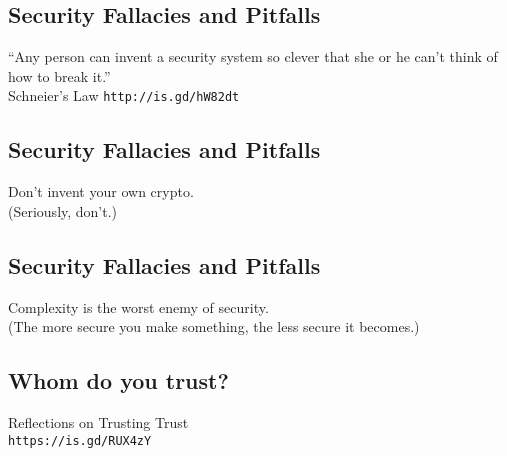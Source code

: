\documentclass[xga]{xdvislides}
\begin{document}
\subsection{Security Fallacies and Pitfalls}
\vspace*{\fill}
\begin{center}
    \Hugesize
        ``Any person can invent a security system so clever that she or he
can't think of how to break it.'' \\
	\vspace{.25in}
	\Normalsize
	Schneier's Law \verb+http://is.gd/hW82dt+
\end{center}
\vspace*{\fill}

\subsection{Security Fallacies and Pitfalls}
\vspace*{\fill}
\begin{center}
    \Hugesize
        Don't invent your own crypto. \\
	\vspace{.25in}
	\Normalsize
	(Seriously, don't.)
\end{center}
\vspace*{\fill}

\subsection{Security Fallacies and Pitfalls}
\vspace*{\fill}
\begin{center}
    \Hugesize
	Complexity is the worst enemy of security. \\
	\vspace{.25in}
	\Normalsize
	(The more secure you make something, the less secure it becomes.)
\end{center}
\vspace*{\fill}

\subsection{Whom do you trust?}
\vspace*{\fill}
\begin{center}
\Huge
	Reflections on Trusting Trust \\

\Normalsize
	\verb+https://is.gd/RUX4zY+
\end{center}
\vspace*{\fill}
\Normalsize
\end{document}
